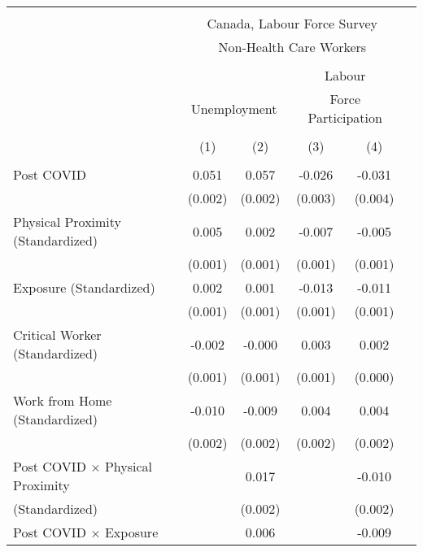 \begin{tabular*}{\textwidth}{ @{\extracolsep{\fill}}l*{5}{c}}
\hline\hline
\\
 &\multicolumn{4}{c}{Canada, Labour Force Survey} \\
 &\multicolumn{4}{c}{Non-Health Care Workers} \\
\cline{2-5} \\
&\multicolumn{2}{c}{} &\multicolumn{2}{c}{Labour} \\
&\multicolumn{2}{c}{Unemployment} &\multicolumn{2}{c}{Force Participation} \\
\cline{2-3} \cline{4-5} \\
                                             &\multicolumn{1}{c}{(1)}     &\multicolumn{1}{c}{(2)}     &\multicolumn{1}{c}{(3)}     &\multicolumn{1}{c}{(4)}\\
\hline
\\
Post COVID                                   &0.051     &0.057     &-0.026     &-0.031\\
                                             &(0.002)     &(0.002)     &(0.003)     &(0.004)\\[0.5em]
%
Physical Proximity (Standardized)            &0.005     &0.002     &-0.007     &-0.005\\
                                             &(0.001)     &(0.001)     &(0.001)     &(0.001)\\[0.5em]
%
Exposure (Standardized)                      &0.002     &0.001     &-0.013     &-0.011\\
                                             &(0.001)     &(0.001)     &(0.001)     &(0.001)\\[0.5em]
%
Critical Worker (Standardized)               &-0.002     &-0.000     &0.003     &0.002\\
                                             &(0.001)     &(0.001)     &(0.001)     &(0.000)\\[0.5em]
%
Work from Home (Standardized)                &-0.010     &-0.009     &0.004     &0.004\\
                                             &(0.002)     &(0.002)     &(0.002)     &(0.002)\\[0.5em]
%
Post COVID $\times$ Physical Proximity       &         &0.017     &         &-0.010\\
(Standardized)                               &         &(0.002)     &         &(0.002)\\[0.5em]
%
Post COVID $\times$ Exposure                 &         &0.006     &         &-0.009\\

\end{tabular*}
